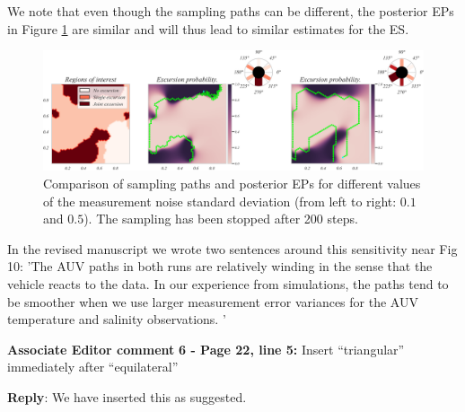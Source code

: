 \documentclass[a4paper]{article}
\newcounter{reviewer}
\def\aecom{\textbf{Associate Editor comment }}
\def\reply{\textbf{Reply}}
\begin{document}
We note that even though the sampling paths can be different, the posterior EPs in Figure \ref{fig:nugget_comparison} are similar and will thus lead to similar estimates for the ES. %

\begin{figure}[h]
    \centering
    \includegraphics[scale=0.52]{ans_to_reviewers/merged_paths_2.png}
    \caption{Comparison of sampling paths and posterior EPs for different values of the measurement noise standard deviation (from left to right: $0.1$ and $0.5$). The sampling has been stopped after 200 steps.}
    \label{fig:nugget_comparison}
\end{figure}
In the revised manuscript we wrote two sentences around this sensitivity near Fig 10: 'The AUV paths in both runs are relatively
winding in the sense that the vehicle reacts to the data. In our
experience from simulations, the paths tend to be smoother when we
use larger measurement error variances for the AUV temperature and salinity observations. '

\vspace{5mm}
\noindent \aecom \textbf{6 - Page 22, line 5:}  Insert “triangular” immediately after “equilateral”

\vspace{5mm}
\reply: We have inserted this as suggested. 

\vspace{1em}


\footnotesize



\end{document}
